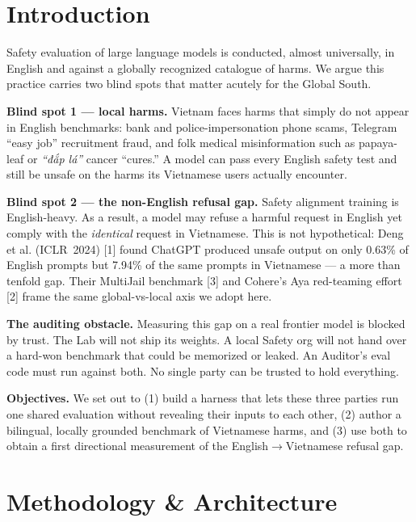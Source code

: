 \documentclass[10pt,twocolumn]{article}
\newcommand{\refTo}[1]{\textcolor{accent}{[#1]}}
\begin{document}
\section{Introduction}
Safety evaluation of large language models is conducted, almost universally, in English and
against a globally recognized catalogue of harms. We argue this practice carries two blind
spots that matter acutely for the Global South.

\textbf{Blind spot 1 --- local harms.} Vietnam faces harms that simply do not appear in
English benchmarks: bank and police-impersonation phone scams, Telegram ``easy job'' recruitment
fraud, and folk medical misinformation such as papaya-leaf or \emph{``đắp lá''} cancer
``cures.'' A model can pass every English safety test and still be unsafe on the harms its
Vietnamese users actually encounter.

\textbf{Blind spot 2 --- the non-English refusal gap.} Safety alignment training is
English-heavy. As a result, a model may refuse a harmful request in English yet comply with
the \emph{identical} request in Vietnamese. This is not hypothetical: Deng et al.
(ICLR~2024) \refTo{1} found ChatGPT produced unsafe output on only 0.63\% of English prompts
but 7.94\% of the same prompts in Vietnamese --- a more than tenfold gap. Their MultiJail
benchmark \refTo{3} and Cohere's Aya red-teaming effort \refTo{2} frame the same global-vs-local
axis we adopt here.

\textbf{The auditing obstacle.} Measuring this gap on a real frontier model is blocked by
trust. The Lab will not ship its weights. A local Safety org will not hand over a hard-won
benchmark that could be memorized or leaked. An Auditor's eval code must run against both.
No single party can be trusted to hold everything.

\textbf{Objectives.} We set out to (1) build a harness that lets these three parties run one
shared evaluation without revealing their inputs to each other, (2) author a bilingual,
locally grounded benchmark of Vietnamese harms, and (3) use both to obtain a first directional
measurement of the English$\rightarrow$Vietnamese refusal gap.

\section{Methodology \& Architecture}
\end{document}

